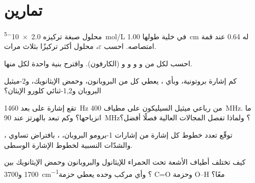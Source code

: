 \section{تمارين}

\begin{exercise}[$\star$]\label{exo:b1:structure-spectroscopy:1}
محلول صبغة تركيزه \qty{2.0e-5}{mol/L} في خلية طولها \qty{1.00}{cm} له
 0.64 عند قمة امتصاصه. احسب $\varepsilon$،
 محلول أكثر تركيزًا بثلاث مرات.
\end{exercise}

\begin{exercise}[$\star$]\label{exo:b1:structure-spectroscopy:2}
احسب  لكل من  و و
و و (الكارفون). واقترح بنية واحدة لكل منها.
\end{exercise}

\begin{exercise}[$\star$]\label{exo:b1:structure-spectroscopy:3}
كم إشارة بروتونية، وبأي ، يعطي كل من البروبانون، وحمض
الإيثانويك، و2-ميثيل البروبان و1,2-ثنائي كلورو الإيثان؟
\end{exercise}

\begin{exercise}[$\star$]\label{exo:b1:structure-spectroscopy:4}
تقع إشارة على بعد \qty{1460}{Hz} من رباعي ميثيل السيليكون على
مطياف \qty{400}{MHz}. ما انزياحها؟ وكم تبعد بالهرتز
عند \qty{90}{MHz}؟ ولماذا تفصل المجالات العالية  فصلًا أفضل؟
\end{exercise}

\begin{exercise}[$\star\star$]\label{exo:b1:structure-spectroscopy:5}
توقّع تعدد خطوط كل إشارة من إشارات 1-برومو البروبان،
، بافتراض تساوي ، والشدّات
النسبية لخطوط الإشارة الوسطى.
\end{exercise}

\begin{exercise}[$\star\star$]\label{exo:b1:structure-spectroscopy:6}
كيف تختلف أطياف الأشعة تحت الحمراء للإيثانول والبروبانون وحمض الإيثانويك
بين 1700 و\qty{3700}{cm^{-1}}؟ وأي مركب وحده يعطي
حزمة C=O وحزمة O--H معًا؟
\end{exercise}

